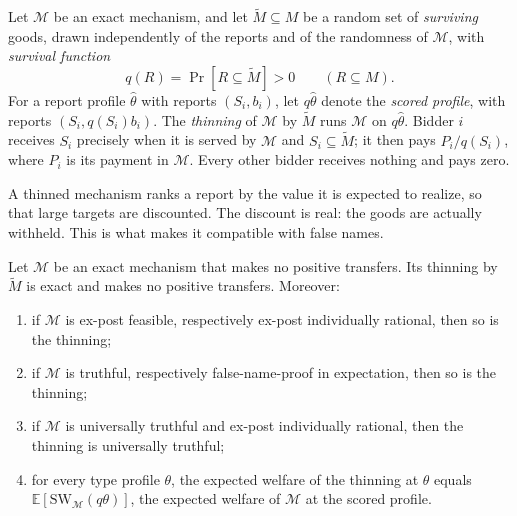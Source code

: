 \documentclass[format=acmsmall, review=false]{acmart}
\newcommand{\E}{\mathbb{E}}
\newcommand{\SW}{\mathrm{SW}}
\begin{document}
\begin{definition}[Thinning]
\label{def:thinning}
Let \(\mathcal M\) be an exact mechanism, and let
\(\widetilde M\subseteq M\) be a random set of \emph{surviving}
goods, drawn independently of the reports and of the randomness
of \(\mathcal M\), with \emph{survival function}
\[
q(R)=\Pr[R\subseteq\widetilde M]>0
\qquad(R\subseteq M).
\]
For a report profile \(\hat\theta\) with reports \((S_i,b_i)\),
let \(q\hat\theta\) denote the \emph{scored profile}, with
reports \((S_i,q(S_i)b_i)\). The \emph{thinning} of
\(\mathcal M\) by \(\widetilde M\) runs \(\mathcal M\) on
\(q\hat\theta\). Bidder \(i\) receives \(S_i\) precisely when it
is served by \(\mathcal M\) and \(S_i\subseteq\widetilde M\); it
then pays \(P_i/q(S_i)\), where \(P_i\) is its payment in
\(\mathcal M\). Every other bidder receives nothing and pays
zero.
\end{definition}

A thinned mechanism ranks a report by the value it is expected
to realize, so that large targets are discounted. The discount is
real: the goods are actually withheld. This is what makes it
compatible with false names.

\begin{theorem}
\label{thm:thinning}
Let \(\mathcal M\) be an exact mechanism that makes no positive
transfers. Its thinning by \(\widetilde M\) is exact and makes
no positive transfers. Moreover:
\begin{enumerate}
\item[(a)] if \(\mathcal M\) is ex-post feasible, respectively
ex-post individually rational, then so is the thinning;
\item[(b)] if \(\mathcal M\) is truthful, respectively
false-name-proof in expectation, then so is the thinning;
\item[(c)] if \(\mathcal M\) is universally truthful and ex-post
individually rational, then the thinning is universally
truthful;
\item[(d)] for every type profile \(\theta\), the expected
welfare of the thinning at \(\theta\) equals
\(\E[\SW_{\mathcal M}(q\theta)]\), the expected welfare of
\(\mathcal M\) at the scored profile.
\end{enumerate}
\end{theorem}
\end{document}
